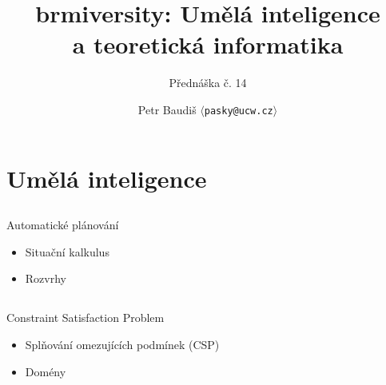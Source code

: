 \documentclass{beamer}
\begin{document}

\title{brmiversity: Umělá inteligence \\ a teoretická informatika}
\subtitle{Přednáška č. 14}
\author{Petr Baudiš $\langle${\tt pasky@ucw.cz}$\rangle$}
\date{}
\frame{\titlepage}

\section{Umělá inteligence}

\subsection{}
\begin{frame}{Automatické plánování}
\begin{itemize}
\item Situační kalkulus
\item Rozvrhy
\end{itemize}
\end{frame}

\subsection{}
\begin{frame}{Constraint Satisfaction Problem}
\begin{itemize}
\item Splňování omezujících podmínek (CSP)
\item Domény
\end{itemize}
\end{frame}

\subsection{}
\end{document}

